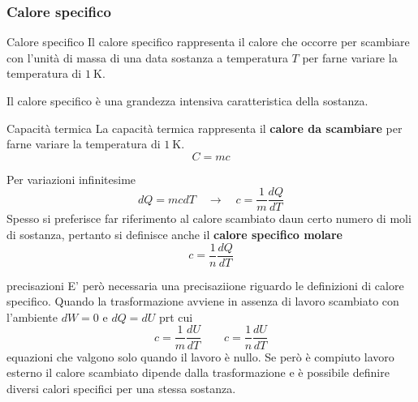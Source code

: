 \documentclass[x11names]{article}
\begin{document}
	\subsubsection{Calore specifico}
	\begin{center}
		\colorbox{myblue}{\begin{minipage}{5.75in}
				\begin{blues}{Calore specifico}
					Il calore specifico rappresenta il calore che occorre per scambiare con l'unità di massa di una data sostanza a temperatura \(T\) per farne variare la temperatura di \(\SI{1}{\kelvin}\).
					
					Il calore specifico è una grandezza intensiva caratteristica della sostanza.
				\end{blues}
		\end{minipage}}
	\end{center}
	\begin{center}
		\colorbox{myblue}{\begin{minipage}{5.75in}
				\begin{blues}{Capacità termica}
					La capacità termica rappresenta il \textbf{calore da scambiare}  per farne variare la temperatura di \(\SI{1}{\kelvin}\).
					\[ 
					C = mc
					\]
				\end{blues}
		\end{minipage}}
	\end{center}
	Per variazioni infinitesime
	\[ 
	dQ  =mc dT \quad \to \quad c = \frac{1}{m}\frac{dQ}{dT}
	\]
	Spesso si preferisce far riferimento al calore scambiato daun certo numero di moli di sostanza, pertanto si definisce   anche il \textbf{calore specifico molare}
	\[ 
	c = \frac{1}{n}\frac{dQ}{dT}
	\]
	\begin{es}{precisazioni}
	 E' però necessaria una precisaziione riguardo le definizioni di calore specifico. Quando la trasformazione avviene in assenza di lavoro scambiato con l'ambiente \(dW = 0\) e \(dQ = dU\) prt cui
	 \begin{equation}
	 	c  = \frac{1}{m}\frac{dU}{dT} \qquad c  = \frac{1}{n}\frac{dU}{dT}
	 \end{equation}
	 equazioni che valgono solo quando il lavoro è nullo. Se però è compiuto lavoro esterno il calore scambiato dipende dalla trasformazione e è possibile definire diversi calori specifici per una stessa sostanza.
	\end{es}
\end{document}
